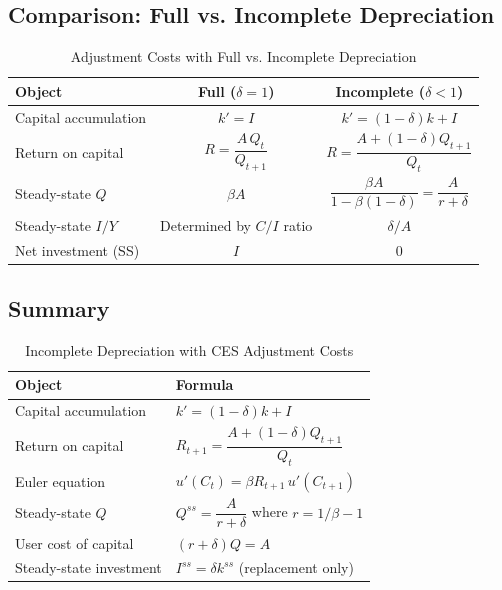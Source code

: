 \subsection{Comparison: Full vs. Incomplete Depreciation}
\label{subsec:ac-dep-comparison}

\begin{table}[H]
\centering
\caption{Adjustment Costs with Full vs. Incomplete Depreciation}
\label{tab:ac-dep-comparison}
\renewcommand{\arraystretch}{1.6}
\begin{tabular}{@{}lcc@{}}
\toprule
\textbf{Object} & \textbf{Full ($\delta = 1$)} & \textbf{Incomplete ($\delta < 1$)} \\
\midrule
Capital accumulation & $k' = I$ & $k' = (1-\delta)k + I$ \\[4pt]
Return on capital & $R = \dfrac{A \, Q_t}{Q_{t+1}}$ & $R = \dfrac{A + (1-\delta) Q_{t+1}}{Q_t}$ \\[10pt]
Steady-state $Q$ & $\beta A$ & $\dfrac{\beta A}{1 - \beta(1-\delta)} = \dfrac{A}{r + \delta}$ \\[10pt]
Steady-state $I/Y$ & Determined by $C/I$ ratio & $\delta / A$ \\[4pt]
Net investment (SS) & $I$ & $0$ \\[4pt]
\bottomrule
\end{tabular}
\end{table}

\subsection{Summary}
\label{subsec:ac-dep-summary}

\begin{table}[H]
\centering
\caption{Incomplete Depreciation with CES Adjustment Costs}
\label{tab:ac-dep-summary}
\renewcommand{\arraystretch}{1.6}
\begin{tabular}{@{}ll@{}}
\toprule
\textbf{Object} & \textbf{Formula} \\
\midrule
Capital accumulation & $k' = (1-\delta) k + I$ \\[6pt]
Return on capital & $R_{t+1} = \dfrac{A + (1-\delta) Q_{t+1}}{Q_t}$ \\[10pt]
Euler equation & $u'(C_t) = \beta R_{t+1} \, u'(C_{t+1})$ \\[6pt]
Steady-state $Q$ & $Q^{ss} = \dfrac{A}{r + \delta}$ where $r = 1/\beta - 1$ \\[10pt]
User cost of capital & $(r + \delta) Q = A$ \\[6pt]
Steady-state investment & $I^{ss} = \delta k^{ss}$ (replacement only) \\[6pt]
\bottomrule
\end{tabular}
\end{table}

